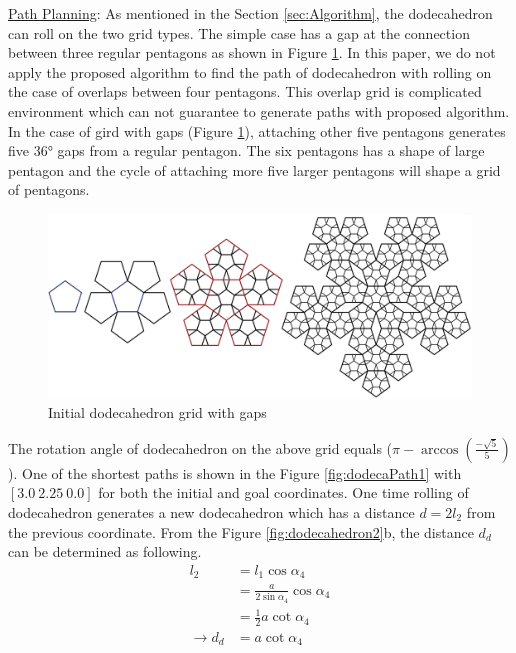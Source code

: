 \noindent\uline{Path Planning}: As mentioned in the Section \ref{sec:Algorithm}, the dodecahedron can roll on the two grid types. 
The simple case has a gap at the connection between three regular pentagons as shown in Figure \ref{fig:dodecaGrid}. 
%
In this paper, we do not apply the proposed algorithm to find the path of dodecahedron with rolling on the case of overlaps between four pentagons. 
This overlap grid is complicated environment which can not guarantee to generate paths with proposed algorithm. 
%
In the case of gird with gaps (Figure \ref{fig:dodecaGrid}), attaching other five pentagons generates five $\ang{36}$ gaps from a regular pentagon. 
The six pentagons has a shape of large pentagon and the cycle of attaching more five larger pentagons will shape a grid of pentagons.
%
\begin{figure}[H]
\centering
	\includegraphics[width=\textwidth]{image/dodecaGrid.png}
	\caption{Initial dodecahedron grid with gaps}
	\label{fig:dodecaGrid}
\end{figure}
\noindent The rotation angle of dodecahedron on the above grid equals 
($\pi-\arccos{(\frac{-\sqrt{5}}{5})}$). 
One of the shortest paths is shown in the Figure \ref{fig:dodecaPath1} with $[3.0\ 2.25\ 0.0]$ for both the initial and goal coordinates.
One time rolling of dodecahedron generates a new dodecahedron which has a distance $d=2l_2$ from the previous coordinate. 
From the Figure \ref{fig:dodecahedron2}b, the distance $d_d$ can be determined as following.
\begin{equation*} 
\label{dodeca:eq4}
\begin{split}
l_2 & = l_1\cos{\alpha_4}\\
    & = \frac{a}{2\sin{\alpha_4}}\cos{\alpha_4}\\
    & = \frac{1}{2}a\cot{\alpha_4}\\
\rightarrow d_d & = a\cot{\alpha_4}
\end{split}
\end{equation*}

